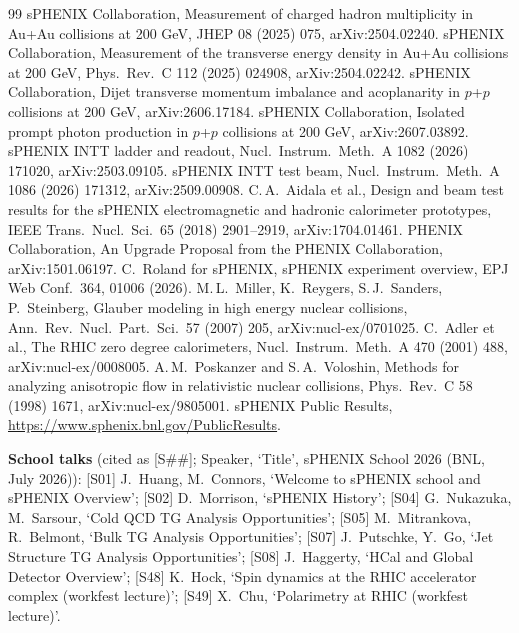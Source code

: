\documentclass[11pt,letterpaper]{article}
\begin{document}
\begin{thebibliography}{99}
 sPHENIX Collaboration, Measurement of charged hadron multiplicity in Au+Au collisions at 200 GeV, JHEP 08 (2025) 075, arXiv:2504.02240.
 sPHENIX Collaboration, Measurement of the transverse energy density in Au+Au collisions at 200 GeV, Phys.\ Rev.\ C 112 (2025) 024908, arXiv:2504.02242.
 sPHENIX Collaboration, Dijet transverse momentum imbalance and acoplanarity in $p$+$p$ collisions at 200 GeV, arXiv:2606.17184.
 sPHENIX Collaboration, Isolated prompt photon production in $p$+$p$ collisions at 200 GeV, arXiv:2607.03892.
 sPHENIX INTT ladder and readout, Nucl.\ Instrum.\ Meth.\ A 1082 (2026) 171020, arXiv:2503.09105.
 sPHENIX INTT test beam, Nucl.\ Instrum.\ Meth.\ A 1086 (2026) 171312, arXiv:2509.00908.
 C.\,A.\ Aidala et al., Design and beam test results for the sPHENIX electromagnetic and hadronic calorimeter prototypes, IEEE Trans.\ Nucl.\ Sci.\ 65 (2018) 2901--2919, arXiv:1704.01461.
 PHENIX Collaboration, An Upgrade Proposal from the PHENIX Collaboration, arXiv:1501.06197.
 C.\ Roland for sPHENIX, sPHENIX experiment overview, EPJ Web Conf.\ 364, 01006 (2026).
 M.\,L.\ Miller, K.\ Reygers, S.\,J.\ Sanders, P.\ Steinberg, Glauber modeling in high energy nuclear collisions, Ann.\ Rev.\ Nucl.\ Part.\ Sci.\ 57 (2007) 205, arXiv:nucl-ex/0701025.
 C.\ Adler et al., The RHIC zero degree calorimeters, Nucl.\ Instrum.\ Meth.\ A 470 (2001) 488, arXiv:nucl-ex/0008005.
 A.\,M.\ Poskanzer and S.\,A.\ Voloshin, Methods for analyzing anisotropic flow in relativistic nuclear collisions, Phys.\ Rev.\ C 58 (1998) 1671, arXiv:nucl-ex/9805001.
 sPHENIX Public Results, \url{https://www.sphenix.bnl.gov/PublicResults}.
\end{thebibliography}
\noindent\textbf{School talks} (cited as [S\#\#]; Speaker, `Title', sPHENIX School 2026 (BNL, July 2026)):
[S01] J.\ Huang, M.\ Connors, `Welcome to sPHENIX school and sPHENIX Overview';
[S02] D.\ Morrison, `sPHENIX History';
[S04] G.\ Nukazuka, M.\ Sarsour, `Cold QCD TG Analysis Opportunities';
[S05] M.\ Mitrankova, R.\ Belmont, `Bulk TG Analysis Opportunities';
[S07] J.\ Putschke, Y.\ Go, `Jet Structure TG Analysis Opportunities';
[S08] J.\ Haggerty, `HCal and Global Detector Overview';
[S48] K.\ Hock, `Spin dynamics at the RHIC accelerator complex (workfest lecture)';
[S49] X.\ Chu, `Polarimetry at RHIC (workfest lecture)'.
\end{document}
